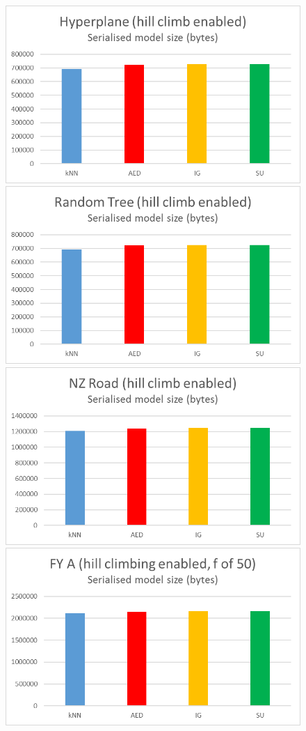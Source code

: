 \begin{figure}[hp]
\includegraphics[scale=0.17]{Graphs/Hyperplane/H_bytes}
\includegraphics[scale=0.17]{Graphs/TreeD10/H_bytes}
\includegraphics[scale=0.17]{Graphs/NZRoad/H_bytes}
\includegraphics[scale=0.17]{Graphs/FY_A/H_bytes}

\end{figure}
